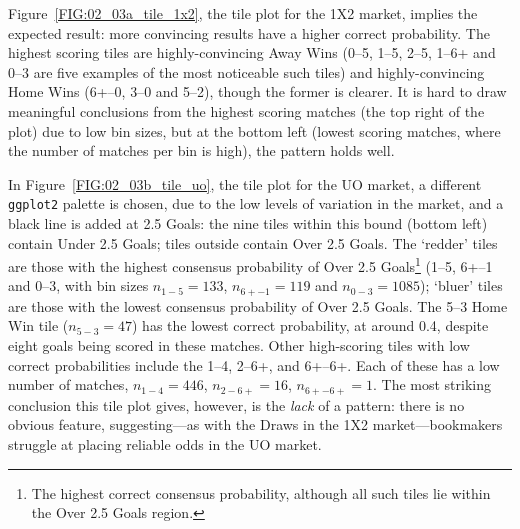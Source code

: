 \documentclass[a4paper,10pt]{report}
\begin{document}
Figure~\ref{FIG:02_03a_tile_1x2}, the tile plot for the 1X2 market, implies the expected result: more convincing results have a higher correct probability. The highest scoring tiles are highly-convincing Away Wins (0--5, 1--5, 2--5, 1--6+ and 0--3 are five examples of the most noticeable such tiles) and highly-convincing Home Wins (6+--0, 3--0 and 5--2), though the former is clearer. It is hard to draw meaningful conclusions from the highest scoring matches (the top right of the plot) due to low bin sizes, but at the bottom left (lowest scoring matches, where the number of matches per bin is high), the pattern holds well. 

In Figure~\ref{FIG:02_03b_tile_uo}, the tile plot for the UO market, a different \lstinline|ggplot2| palette is chosen, due to the low levels of variation in the market, and a black line is added at 2.5 Goals: the nine tiles within this bound (bottom left) contain Under 2.5 Goals; tiles outside contain Over 2.5 Goals. The `redder' tiles are those with the highest consensus probability of Over 2.5 Goals\footnote{The highest correct consensus probability, although all such tiles lie within the Over 2.5 Goals region.} (1--5, 6+--1 and 0--3, with bin sizes $n_{1-5} = 133$, $n_{6+-1}=119$ and $n_{0-3}=1085$); `bluer' tiles are those with the lowest consensus probability of Over 2.5 Goals. The 5--3 Home Win tile ($n_{5-3} = 47$) has the lowest correct probability, at around 0.4, despite eight goals being scored in these matches. Other high-scoring tiles with low correct probabilities include the 1--4, 2--6+, and 6+--6+. Each of these has a low number of matches, $n_{1-4} = 446$, $n_{2-6+} = 16$, $n_{6+-6+} = 1$. The most striking conclusion this tile plot gives, however, is the \textit{lack} of a pattern: there is no obvious feature, suggesting---as with the Draws in the 1X2 market---bookmakers struggle at placing reliable odds in the UO market.
\end{document}
